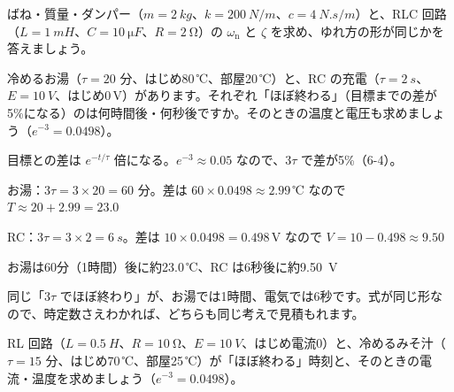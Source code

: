 \begin{jibun}
ばね・質量・ダンパー（$m=\qty{2}{kg}$、$k=\qty{200}{N/m}$、$c=\qty{4}{N.s/m}$）と、RLC 回路（$L=\qty{1}{mH}$、$C=\qty{10}{\micro F}$、$R=\qty{2}{\ohm}$）の $\omega_{\mathrm n}$ と $\zeta$ を求め、ゆれ方の形が同じかを答えましょう。
\end{jibun}

\begin{reidai}[時定数をくらべる]
冷めるお湯（$\tau=20$ 分、はじめ80\,℃、部屋20\,℃）と、RC の充電（$\tau=\qty{2}{s}$、$E=\qty{10}{V}$、はじめ0\,V）があります。それぞれ「ほぼ終わる」（目標までの差が5\%になる）のは何時間後・何秒後ですか。そのときの温度と電圧も求めましょう（$e^{-3}=0.0498$）。\par
\kangaekata 目標との差は $e^{-t/\tau}$ 倍になる。$e^{-3}\approx0.05$ なので、$3\tau$ で差が5\%（6-4）。\par
\shiki\kvips{}\zw{} お湯：$3\tau=3\times20=60$ 分。差は $60\times0.0498\approx2.99$\,℃ なので $T\approx20+2.99=23.0$\par
\kvipa RC：$3\tau=3\times2=\qty{6}{s}$。差は $10\times0.0498=0.498$\,V なので $V=10-0.498\approx9.50$\par
\kotae\kvips{}\zw{} お湯は60分（1時間）後に約23.0\,℃、RC は6秒後に約\qty{9.50}{V}
\end{reidai}
同じ「$3\tau$ でほぼ終わり」が、お湯では1時間、電気では6秒です。式が同じ形なので、時定数さえわかれば、どちらも同じ考えで見積もれます。

\begin{jibun}
RL 回路（$L=\qty{0.5}{H}$、$R=\qty{10}{\ohm}$、$E=\qty{10}{V}$、はじめ電流0）と、冷めるみそ汁（$\tau=15$ 分、はじめ70\,℃、部屋25\,℃）が「ほぼ終わる」時刻と、そのときの電流・温度を求めましょう（$e^{-3}=0.0498$）。
\end{jibun}

